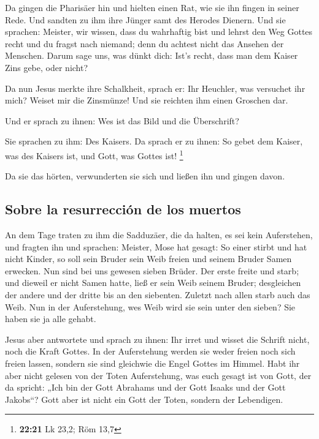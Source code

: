  Da gingen die Pharisäer hin und hielten einen Rat, wie
sie ihn fingen in seiner Rede.  Und sandten zu ihm ihre
Jünger samt des Herodes Dienern. Und sie sprachen: Meister, wir wissen,
dass du wahrhaftig bist und lehrst den Weg Gottes recht und du fragst
nach niemand; denn du achtest nicht das Ansehen der Menschen.
 Darum sage uns, was dünkt dich: Ist's recht, dass man
dem Kaiser Zins gebe, oder nicht?

 Da nun Jesus merkte ihre Schalkheit, sprach er: Ihr
Heuchler, was versuchet ihr mich?  Weiset mir die
Zinsmünze! Und sie reichten ihm einen Groschen dar.

 Und er sprach zu ihnen: Wes ist das Bild und die
Überschrift?

 Sie sprachen zu ihm: Des Kaisers. Da sprach er zu ihnen:
So gebet dem Kaiser, was des Kaisers ist, und Gott, was Gottes ist!
\footnote{\textbf{22:21} Lk 23,2; Röm 13,7}

 Da sie das hörten, verwunderten sie sich und ließen ihn
und gingen davon.

\hypertarget{sobre-la-resurrecciuxf3n-de-los-muertos}{%
\subsection{Sobre la resurrección de los
muertos}\label{sobre-la-resurrecciuxf3n-de-los-muertos}}

 An dem Tage traten zu ihm die Sadduzäer, die da halten,
es sei kein Auferstehen, und fragten ihn  und sprachen:
Meister, Mose hat gesagt: So einer stirbt und hat nicht Kinder, so soll
sein Bruder sein Weib freien und seinem Bruder Samen erwecken.
 Nun sind bei uns gewesen sieben Brüder. Der erste freite
und starb; und dieweil er nicht Samen hatte, ließ er sein Weib seinem
Bruder;  desgleichen der andere und der dritte bis an den
siebenten.  Zuletzt nach allen starb auch das Weib.
 Nun in der Auferstehung, wes Weib wird sie sein unter
den sieben? Sie haben sie ja alle gehabt.

 Jesus aber antwortete und sprach zu ihnen: Ihr irret und
wisset die Schrift nicht, noch die Kraft Gottes.  In der
Auferstehung werden sie weder freien noch sich freien lassen, sondern
sie sind gleichwie die Engel Gottes im Himmel.  Habt ihr
aber nicht gelesen von der Toten Auferstehung, was euch gesagt ist von
Gott, der da spricht:  „Ich bin der Gott Abrahams und der
Gott Isaaks und der Gott Jakobs``? Gott aber ist nicht ein Gott der
Toten, sondern der Lebendigen.

